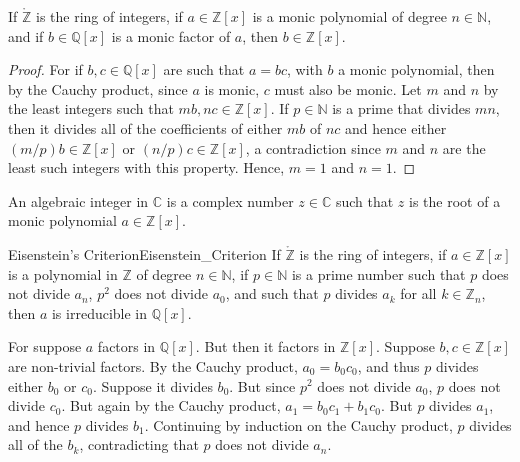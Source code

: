\documentclass{article}                                                        %
\begin{document}
        \begin{theorem}
            If $\ring{\mathbb{Z}}$ is the ring of integers, if
            $a\in\mathbb{Z}[x]$ is a monic polynomial of degree
            $n\in\mathbb{N}$, and if $b\in\mathbb{Q}[x]$ is a monic factor of
            $a$, then $b\in\mathbb{Z}[x]$.
        \end{theorem}
        \begin{proof}
            For if $b,c\in\mathbb{Q}[x]$ are such that $a=bc$, with $b$ a monic
            polynomial, then by the Cauchy product, since $a$ is monic, $c$
            must also be monic. Let $m$ and $n$ by the least integers such that
            $mb,nc\in\mathbb{Z}[x]$. If $p\in\mathbb{N}$ is a prime that divides
            $mn$, then it divides all of the coefficients of either $mb$ of $nc$
            and hence either $(m/p)b\in\mathbb{Z}[x]$ or
            $(n/p)c\in\mathbb{Z}[x]$, a contradiction since $m$ and $n$ are the
            least such integers with this property. Hence, $m=1$ and $n=1$.
        \end{proof}
        \begin{definition}
            An algebraic integer in $\mathbb{C}$ is a complex number
            $z\in\mathbb{C}$ such that $z$ is the root of a monic polynomial
            $a\in\mathbb{Z}[x]$.
        \end{definition}
        \begin{ftheorem}{Eisenstein's Criterion}{Eisenstein_Criterion}
            If $\ring{\mathbb{Z}}$ is the ring of integers, if
            $a\in\mathbb{Z}[x]$ is a polynomial in $\mathbb{Z}$ of degree
            $n\in\mathbb{N}$, if $p\in\mathbb{N}$ is a prime number such that
            $p$ does not divide $a_{n}$, $p^{2}$ does not divide $a_{0}$, and
            such that $p$ divides $a_{k}$ for all $k\in\mathbb{Z}_{n}$, then $a$
            is irreducible in $\mathbb{Q}[x]$.
        \end{ftheorem}
        \begin{bproof}
            For suppose $a$ factors in $\mathbb{Q}[x]$. But then it factors in
            $\mathbb{Z}[x]$. Suppose $b,c\in\mathbb{Z}[x]$ are non-trivial
            factors. By the Cauchy product, $a_{0}=b_{0}c_{0}$, and thus
            $p$ divides either $b_{0}$ or $c_{0}$. Suppose it divides $b_{0}$.
            But since $p^{2}$ does not divide $a_{0}$, $p$ does not divide
            $c_{0}$. But again by the Cauchy product,
            $a_{1}=b_{0}c_{1}+b_{1}c_{0}$. But $p$ divides $a_{1}$, and hence
            $p$ divides $b_{1}$. Continuing by induction on the Cauchy product,
            $p$ divides all of the $b_{k}$, contradicting that $p$ does not
            divide $a_{n}$.
        \end{bproof}
\end{document}
